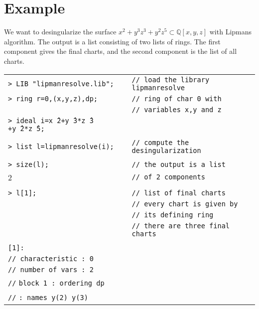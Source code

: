 \documentclass{article}
\begin{document}
\section{Example}
We want to desingularize the surface $x^2+y^3z^3+y^2z^5\subset\mathbb{Q}[x,y,z]$ 
with Lipmans algorithm. The output is a list consisting of two lists of rings. 
The first component gives the final charts, and the second component is the list 
of all charts.\\

\begin{table}[htbp]
	\begin{tabular}{ll}
		\texttt{> LIB "lipmanresolve.lib"; } &  \texttt{// load the library lipmanresolve} \\
		\texttt{> ring r=0,(x,y,z),dp;} & \texttt{// ring of char 0 with} \\
		 &  \texttt{// variables x,y and z} \\
		\texttt{> ideal i=x\^\ \hspace*{-0.1cm}2+y\^\ \hspace*{-0.1cm}3*z\^\ \hspace*{-0.1cm}3
		+y\^\ \hspace*{-0.1cm}2*z\^\ \hspace*{-0.1cm}5;} & \\ \\
		\texttt{> list l=lipmanresolve(i);} &  \texttt{// compute the desingularization} \\ \\
		\texttt{> size(l); } &   \texttt{// the output is a list} \\
		2 &   \texttt{// of 2 components } \\ \\
		\texttt{> l[1]; } &   \texttt{// list of final charts} \\
		&   \texttt{// every chart is given by} \\
		&   \texttt{// its defining ring} \\ 
		&   \texttt{// there are three final charts}\\ \\
		\texttt{[1]:}  &   \\ 
		\texttt{// characteristic : 0}         &  \\
		\texttt{// number of vars : 2}  &   \\
		\texttt{//} \hspace*{1.2cm} \texttt{block   1 : ordering dp}  &   \\
		\texttt{//} \hspace*{2.7cm}  \texttt{: names    y(2) y(3)}  &   \\

\end{tabular}
\end{table}
\end{document}

